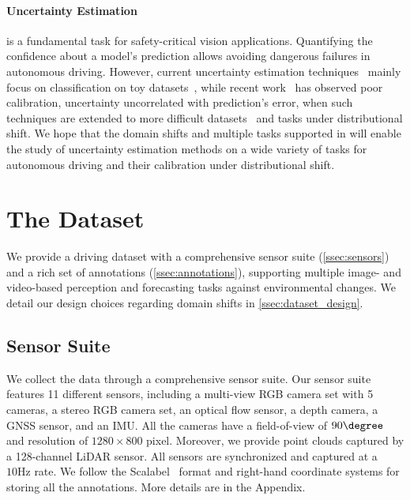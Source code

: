 \paragraph{Uncertainty Estimation} is a fundamental task for safety-critical vision applications. Quantifying the confidence about a model's prediction allows avoiding dangerous failures in autonomous driving.
However, current uncertainty estimation techniques~\cite{lakshminarayanan2017simple,gal2016dropout,liu2020simple,postels2020hidden} mainly focus on classification on toy datasets~\cite{krizhevsky2014cifar,lecun1998mnist}, while recent work~\cite{postels2021practicality} has observed poor calibration, \ie{} uncertainty uncorrelated with prediction's error, when such techniques are extended to more difficult datasets~\cite{hendrycks2019benchmarking} and tasks under distributional shift.
We hope that the domain shifts and multiple tasks supported in \thedataset{} will enable the study of uncertainty estimation methods on a wide variety of tasks for autonomous driving and their calibration under distributional shift. 

\section{The \thedataset{} Dataset}
We provide a driving dataset with a comprehensive sensor suite (\autoref{ssec:sensors}) and a rich set of annotations (\autoref{ssec:annotations}), supporting multiple image- and video-based perception and forecasting tasks against environmental changes. 
We detail our design choices regarding domain shifts in \autoref{ssec:dataset_design}.

\subsection{Sensor Suite} \label{ssec:sensors}
We collect the data through a comprehensive sensor suite. 
Our sensor suite features 11 different sensors, including a multi-view RGB camera set with 5 cameras, a stereo RGB camera set, an optical flow sensor, a depth camera, a GNSS sensor, and an IMU. All the cameras have a field-of-view of $90\degree$ and resolution of $1280 \times 800$ pixel.
Moreover, we provide point clouds captured by a 128-channel LiDAR sensor.
All sensors are synchronized and captured at a $10 \mathrm{Hz}$ rate. 
We follow the Scalabel~\cite{scalabel} format and right-hand coordinate systems for storing all the annotations.
More details are in the Appendix.

